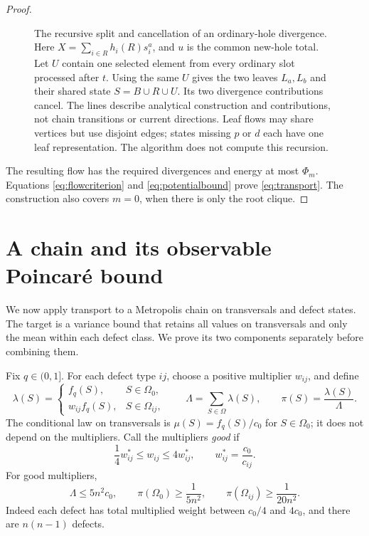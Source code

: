 \documentclass[11pt]{article}
\theoremstyle{definition}
\newcommand{\Om}{\Omega}
\begin{document}
\begin{proof}
\begin{figure}[tbp]
\centering

\caption{The recursive split and cancellation of an ordinary-hole
divergence.  Here $X=\sum_{i\in R}h_i(R)s_i^a$, and $u$ is the common
new-hole total.  Let $U$ contain one selected element from every ordinary
slot processed after $t$.  Using the same $U$ gives the two
leaves $L_a,L_b$ and their shared state $S=B\cup R\cup U$.
Its two divergence contributions cancel.  The lines describe analytical
construction and contributions, not chain transitions or current
directions.  Leaf flows may share vertices but use disjoint edges;
states missing $p$ or $d$ each have one leaf representation.
The algorithm does not compute this recursion.}
\label{fig:transport}
\end{figure}

The resulting flow has the required divergences and energy at most
$\Phi_m$.  Equations \eqref{eq:flowcriterion} and
\eqref{eq:potentialbound} prove \eqref{eq:transport}.
The construction also covers $m=0$, when there is only the root clique.
\end{proof}

\section{A chain and its observable Poincar\'e bound}\label{sec:chain}

We now apply transport to a Metropolis chain on transversals and defect
states.  The target is a variance bound that retains all values on
transversals and only the mean within each defect class.  We prove its
two components separately before combining them.

Fix $q\in(0,1]$.  For each defect type $ij$, choose a positive multiplier
$w_{ij}$, and define
\begin{equation}\label{eq:chainweights}
 \lambda(S)=
 \begin{cases}
 f_q(S),&S\in\Om_0,\\
 w_{ij}f_q(S),&S\in\Om_{ij},
 \end{cases}
 \qquad
 \Lambda=\sum_{S\in\Om}\lambda(S),\qquad \pi(S)=\frac{\lambda(S)}\Lambda.
\end{equation}
The conditional law on transversals is
$\mu(S)=f_q(S)/c_0$ for $S\in\Om_0$; it does not depend on the
multipliers.  Call the multipliers \emph{good} if
\begin{equation}\label{eq:good}
 \frac14w^*_{ij}\le w_{ij}\le4w^*_{ij},
 \qquad w^*_{ij}=\frac{c_0}{c_{ij}}.
\end{equation}
For good multipliers,
\begin{equation}\label{eq:typemasses}
 \Lambda\le5n^2c_0,\qquad
 \pi(\Om_0)\ge\frac1{5n^2},\qquad
 \pi(\Om_{ij})\ge\frac1{20n^2}.
\end{equation}
Indeed each defect has total multiplied weight between $c_0/4$ and
$4c_0$, and there are $n(n-1)$ defects.
\end{document}
